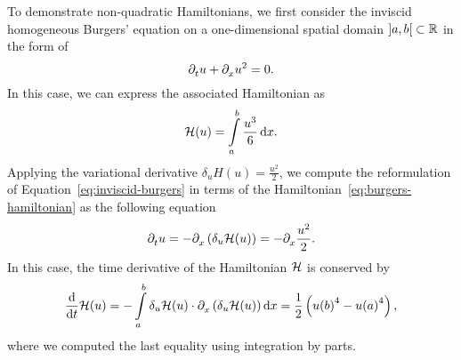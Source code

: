 \begin{example}\label{ex:inviscid-burgers}
    To demonstrate non-quadratic Hamiltonians, we first consider the inviscid homogeneous Burgers' equation on a one-dimensional spatial domain $\interval[open]{a}{b} \subset \bb{R}$ in the form of
    \begin{equation}\label{eq:inviscid-burgers}
        \pd[t]{} u + \pd[x]{} u^2 = 0.
    \end{equation}
    In this case, we can express the associated Hamiltonian as
    \begin{equation}\label{eq:burgers-hamiltonian}
        \mcl{H}(u) = \int\limits_a^b \frac{u^3}{6} \dif x.
    \end{equation}
    Applying the variational derivative $\delta_u H(u) = \frac{u^2}{2}$, we compute the reformulation of Equation~\eqref{eq:inviscid-burgers} in terms of the Hamiltonian~\eqref{eq:burgers-hamiltonian} as the following equation
    \begin{equation*}
        \pd[t]{} u = - \pd{} \left( \delta_u \mcl{H}(u) \right) = -\pd{} \frac{u^2}{2}.
    \end{equation*}
    In this case, the time derivative of the Hamiltonian $\mcl{H}$ is conserved by
    \begin{equation*}
        \frac{\dif}{\dif t} \mcl{H}(u) = - \int\limits_a^b \delta_u \mcl{H}(u) \cdot \pd{} \left( \delta_u \mcl{H}(u) \right) \dif x = \frac{1}{2} \left( {u(b)}^4 - {u(a)}^4 \right),
    \end{equation*}
    where we computed the last equality using integration by parts.
\end{example}
